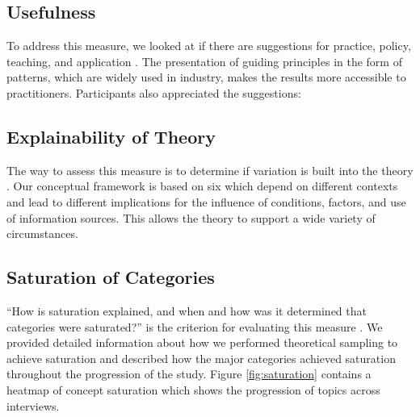 \subsection{Usefulness} To address this measure, we looked at if there are suggestions for practice, policy, teaching, and application \cite{corbin2014gt}. %
The presentation of guiding principles in the form of patterns, which are widely used in industry, makes the results more accessible to practitioners. Participants also appreciated the suggestions:

\subsection{Explainability of Theory} The way to assess this measure is to determine if variation is built into the theory \cite{corbin2014gt}. Our conceptual framework is based on six {\principle} which depend on different contexts and lead to different implications for the influence of conditions, factors, and use of information sources. This allows the theory to support a wide variety of circumstances.

\subsection{Saturation of Categories} ``How is saturation explained, and when and how was it determined that categories were saturated?'' is the criterion for evaluating this measure \cite{corbin2014gt}. We provided detailed information about how we performed theoretical sampling to achieve saturation and described how the major categories achieved saturation throughout the progression of the study. Figure \ref{fig:saturation} contains a heatmap of concept saturation which shows the progression of topics across interviews.

